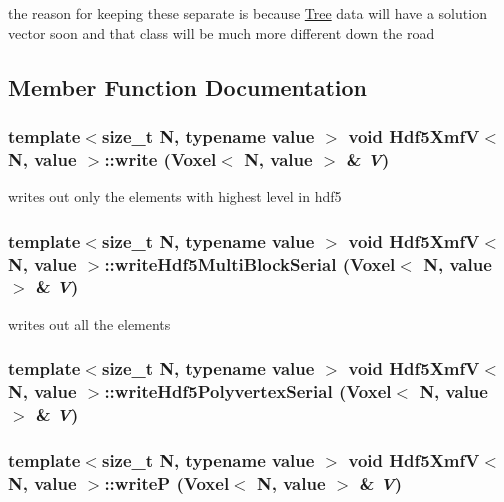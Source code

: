 the reason for keeping these separate is because \hyperlink{classTree}{Tree} data will have a solution vector soon and that class will be much more different down the road 

\subsection{Member Function Documentation}
\hypertarget{classHdf5XmfV_a1b5ca0189c327d3080da1de92a99047f}{
\subsubsection[{write}]{\setlength{\rightskip}{0pt plus 5cm}template$<$size\_\-t N, typename value $>$ void {\bf Hdf5XmfV}$<$ N, value $>$::write ({\bf Voxel}$<$ N, value $>$ \& {\em V})}}
\label{classHdf5XmfV_a1b5ca0189c327d3080da1de92a99047f}
writes out only the elements with highest level in hdf5 \hypertarget{classHdf5XmfV_ac0518586e7645121c0cd0b1fbf1cedda}{
\subsubsection[{writeHdf5MultiBlockSerial}]{\setlength{\rightskip}{0pt plus 5cm}template$<$size\_\-t N, typename value $>$ void {\bf Hdf5XmfV}$<$ N, value $>$::writeHdf5MultiBlockSerial ({\bf Voxel}$<$ N, value $>$ \& {\em V})}}
\label{classHdf5XmfV_ac0518586e7645121c0cd0b1fbf1cedda}
writes out all the elements \hypertarget{classHdf5XmfV_acbfe982bd279b8b319192599ff5a2dbe}{
\subsubsection[{writeHdf5PolyvertexSerial}]{\setlength{\rightskip}{0pt plus 5cm}template$<$size\_\-t N, typename value $>$ void {\bf Hdf5XmfV}$<$ N, value $>$::writeHdf5PolyvertexSerial ({\bf Voxel}$<$ N, value $>$ \& {\em V})}}
\label{classHdf5XmfV_acbfe982bd279b8b319192599ff5a2dbe}
\hypertarget{classHdf5XmfV_a59e1e8befe19492a44253a6e2a88dbf4}{
\subsubsection[{writeP}]{\setlength{\rightskip}{0pt plus 5cm}template$<$size\_\-t N, typename value $>$ void {\bf Hdf5XmfV}$<$ N, value $>$::writeP ({\bf Voxel}$<$ N, value $>$ \& {\em V})}}
